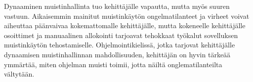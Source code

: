 Dynaaminen muistinhallinta tuo kehittäjälle vapautta, mutta myös suuren vastuun. Aikaisemmin mainitut muistinkäytön ongelmatilanteet ja virheet voivat aiheuttaa päänvaivaa kokemattomalle kehittäjälle, mutta kokeneelle kehittäjälle osoittimet ja manuaalinen allokointi tarjoavat tehokkaat työkalut sovelluksen muistinkäytön tehostamiselle. Ohjelmointikielissä, jotka tarjovat kehittäjälle dynaamisen muistinhallinnan mahdollisuuden, kehittäjän on hyvin tärkeää ymmärtää, miten ohjelman muisti toimii, jotta näiltä onglematilanteilta vältytään.


